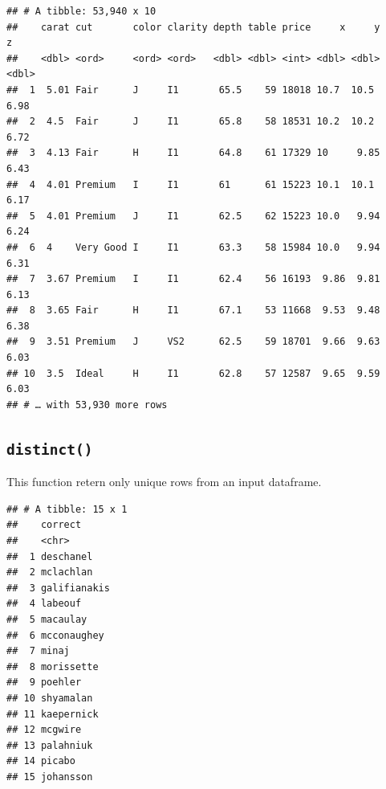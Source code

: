 \documentclass[
]{book}
\newenvironment{Shaded}{\begin{snugshade}}{\end{snugshade}}
\newcommand{\KeywordTok}[1]{\textcolor[rgb]{0.13,0.29,0.53}{\textbf{#1}}}
\newcommand{\NormalTok}[1]{#1}
\newcommand{\OperatorTok}[1]{\textcolor[rgb]{0.81,0.36,0.00}{\textbf{#1}}}
\newcommand{\StringTok}[1]{\textcolor[rgb]{0.31,0.60,0.02}{#1}}
\begin{document}
\begin{verbatim}
## # A tibble: 53,940 x 10
##    carat cut       color clarity depth table price     x     y     z
##    <dbl> <ord>     <ord> <ord>   <dbl> <dbl> <int> <dbl> <dbl> <dbl>
##  1  5.01 Fair      J     I1       65.5    59 18018 10.7  10.5   6.98
##  2  4.5  Fair      J     I1       65.8    58 18531 10.2  10.2   6.72
##  3  4.13 Fair      H     I1       64.8    61 17329 10     9.85  6.43
##  4  4.01 Premium   I     I1       61      61 15223 10.1  10.1   6.17
##  5  4.01 Premium   J     I1       62.5    62 15223 10.0   9.94  6.24
##  6  4    Very Good I     I1       63.3    58 15984 10.0   9.94  6.31
##  7  3.67 Premium   I     I1       62.4    56 16193  9.86  9.81  6.13
##  8  3.65 Fair      H     I1       67.1    53 11668  9.53  9.48  6.38
##  9  3.51 Premium   J     VS2      62.5    59 18701  9.66  9.63  6.03
## 10  3.5  Ideal     H     I1       62.8    57 12587  9.65  9.59  6.03
## # … with 53,930 more rows
\end{verbatim}

\hypertarget{distinct}{%
\subsection{\texorpdfstring{\texttt{distinct()}}{distinct()}}\label{distinct}}

This function retern only unique rows from an input dataframe.

\begin{Shaded}
\end{Shaded}

\begin{verbatim}
## # A tibble: 15 x 1
##    correct     
##    <chr>       
##  1 deschanel   
##  2 mclachlan   
##  3 galifianakis
##  4 labeouf     
##  5 macaulay    
##  6 mcconaughey 
##  7 minaj       
##  8 morissette  
##  9 poehler     
## 10 shyamalan   
## 11 kaepernick  
## 12 mcgwire     
## 13 palahniuk   
## 14 picabo      
## 15 johansson
\end{verbatim}

\begin{Shaded}
\end{Shaded}
\end{document}

